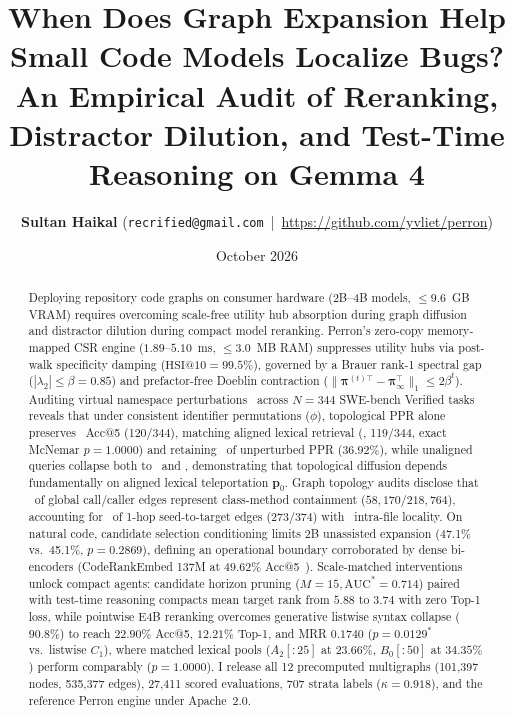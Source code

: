 \documentclass[10pt]{article}
\title{\vspace{-1.8em}\Large\textbf{When Does Graph Expansion Help Small Code Models Localize Bugs? An Empirical Audit of Reranking, Distractor Dilution, and Test-Time Reasoning on Gemma 4}\vspace{-0.6em}}
\author{
    \normalsize\textbf{Sultan Haikal} \quad (\texttt{recrified@gmail.com} \,|\, \url{https://github.com/yvliet/perron})\vspace{-0.8em}
}
\date{October 2026}
\begin{document}
\maketitle
\thispagestyle{plain}
\vspace{-1.0em}
\begin{abstract}
\noindent Deploying repository code graphs on consumer hardware (2B--4B models, $\le 9.6$~GB VRAM) requires overcoming scale-free utility hub absorption during graph diffusion and distractor dilution during compact model reranking. Perron's zero-copy memory-mapped CSR engine ($1.89\text{--}5.10$~ms, $\le 3.0$~MB RAM) suppresses utility hubs via post-walk specificity damping ($\text{HSI@10} = 99.5\%$), governed by a Brauer rank-1 spectral gap ($|\lambda_2| \le \beta = 0.85$) and prefactor-free Doeblin contraction ($\|\boldsymbol{\pi}^{(t)\top} - \boldsymbol{\pi}_\infty^\top\|_1 \le 2\beta^t$). Auditing virtual namespace perturbations~\cite{chen2024schrodinger} across $N=344$ SWE-bench Verified tasks reveals that under consistent identifier permutations ($\phi$), topological PPR alone preserves \HonestLevelTwoConsistentPPRAccFive\ Acc@5 (120/344), matching aligned lexical retrieval (\HonestLevelTwoConsistentBMTwentyFiveAccFive, 119/344, exact McNemar $p = 1.0000$) and retaining \HonestLevelTwoConsistentPPRRetentionPct\ of unperturbed PPR ($36.92\%$), while unaligned queries collapse both to \HonestLevelTwoUnalignedPPRAccFive\ and \HonestLevelTwoUnalignedBMTwentyFiveAccFive, demonstrating that topological diffusion depends fundamentally on aligned lexical teleportation $\mathbf{p}_0$. Graph topology audits disclose that \HonestContainmentGlobalFraction\ of global call/caller edges represent class-method containment ($58{,}170/218{,}764$), accounting for \HonestContainmentOneHopPct\ of 1-hop seed-to-target edges ($273/374$) with \HonestContainmentOneHopIntraFilePct\ intra-file locality. On natural code, candidate selection conditioning limits 2B unassisted expansion (47.1\% vs.\ 45.1\%, $p=0.2869$), defining an operational boundary corroborated by dense bi-encoders (CodeRankEmbed 137M at $49.62\%$ Acc@5~\cite{suresh2024coderankembed}). Scale-matched interventions unlock compact agents: candidate horizon pruning ($M=15, \text{AUC}^*=0.714$) paired with test-time reasoning compacts mean target rank from $5.88$ to $3.74$ with zero Top-1 loss, while pointwise E4B reranking overcomes generative listwise syntax collapse ($90.8\%$) to reach $22.90\%$ Acc@5, $12.21\%$ Top-1, and MRR $0.1740$ ($p=0.0129^*$ vs.\ listwise $C_1$), where matched lexical pools ($A_2[:25]$ at $23.66\%$, $B_0[:50]$ at $34.35\%$) perform comparably ($p=1.0000$). I release all 12 precomputed multigraphs (101,397 nodes, 535,377 edges), 27,411 scored evaluations, 707 strata labels ($\kappa=0.918$), and the reference Perron engine under Apache~2.0.
\end{abstract}
\end{document}
